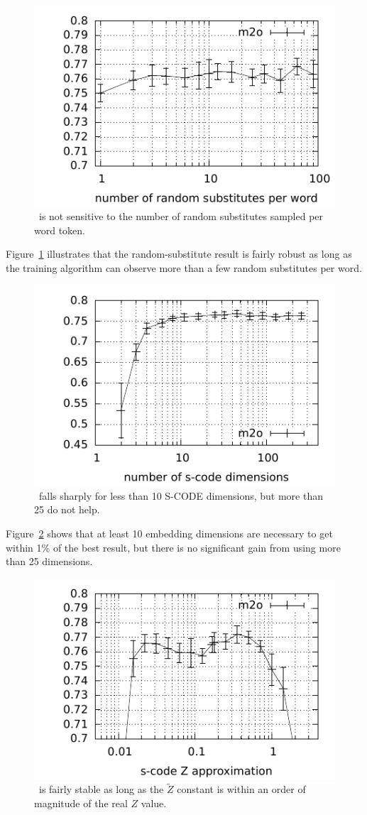 
\begin{figure}[ht] \centering
\includegraphics[width=0.5\linewidth]{plot-s-cl.pdf}
\caption{\mto\ is not sensitive to the number of random substitutes
  sampled per word token.}
\label{plot-s}
\end{figure}

Figure~\ref{plot-s} illustrates that the
random-substitute result is fairly robust as long as the training
algorithm can observe more than a few random substitutes per word.

\begin{figure}[ht] \centering
\includegraphics[width=0.5\linewidth]{plot-d-cl.pdf}
\caption{\mto\ falls sharply for less than 10 S-CODE dimensions, but
  more than 25 do not help.}
\label{plot-d}
\end{figure}

Figure~\ref{plot-d} shows that at least 10 embedding dimensions are
necessary to get within 1\% of the best result, but there is no
significant gain from using more than 25 dimensions.

\begin{figure}[ht] \centering
\includegraphics[width=0.5\linewidth]{plot-z-cl.pdf}
\caption{\mto\ is fairly stable as long as the $\tilde{Z}$ constant is
  within an order of magnitude of the real $Z$ value.}
\label{plot-z}
\end{figure}

